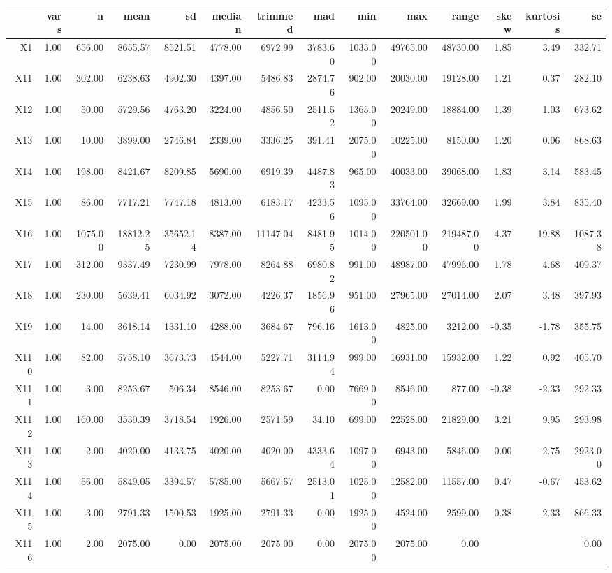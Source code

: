 % 
\begin{tabular}{rrrrrrrrrrrrrr}
  \hline
 & vars & n & mean & sd & median & trimmed & mad & min & max & range & skew & kurtosis & se \\ 
  \hline
X1 & 1.00 & 656.00 & 8655.57 & 8521.51 & 4778.00 & 6972.99 & 3783.60 & 1035.00 & 49765.00 & 48730.00 & 1.85 & 3.49 & 332.71 \\ 
  X11 & 1.00 & 302.00 & 6238.63 & 4902.30 & 4397.00 & 5486.83 & 2874.76 & 902.00 & 20030.00 & 19128.00 & 1.21 & 0.37 & 282.10 \\ 
  X12 & 1.00 & 50.00 & 5729.56 & 4763.20 & 3224.00 & 4856.50 & 2511.52 & 1365.00 & 20249.00 & 18884.00 & 1.39 & 1.03 & 673.62 \\ 
  X13 & 1.00 & 10.00 & 3899.00 & 2746.84 & 2339.00 & 3336.25 & 391.41 & 2075.00 & 10225.00 & 8150.00 & 1.20 & 0.06 & 868.63 \\ 
  X14 & 1.00 & 198.00 & 8421.67 & 8209.85 & 5690.00 & 6919.39 & 4487.83 & 965.00 & 40033.00 & 39068.00 & 1.83 & 3.14 & 583.45 \\ 
  X15 & 1.00 & 86.00 & 7717.21 & 7747.18 & 4813.00 & 6183.17 & 4233.56 & 1095.00 & 33764.00 & 32669.00 & 1.99 & 3.84 & 835.40 \\ 
  X16 & 1.00 & 1075.00 & 18812.25 & 35652.14 & 8387.00 & 11147.04 & 8481.95 & 1014.00 & 220501.00 & 219487.00 & 4.37 & 19.88 & 1087.38 \\ 
  X17 & 1.00 & 312.00 & 9337.49 & 7230.99 & 7978.00 & 8264.88 & 6980.82 & 991.00 & 48987.00 & 47996.00 & 1.78 & 4.68 & 409.37 \\ 
  X18 & 1.00 & 230.00 & 5639.41 & 6034.92 & 3072.00 & 4226.37 & 1856.96 & 951.00 & 27965.00 & 27014.00 & 2.07 & 3.48 & 397.93 \\ 
  X19 & 1.00 & 14.00 & 3618.14 & 1331.10 & 4288.00 & 3684.67 & 796.16 & 1613.00 & 4825.00 & 3212.00 & -0.35 & -1.78 & 355.75 \\ 
  X110 & 1.00 & 82.00 & 5758.10 & 3673.73 & 4544.00 & 5227.71 & 3114.94 & 999.00 & 16931.00 & 15932.00 & 1.22 & 0.92 & 405.70 \\ 
  X111 & 1.00 & 3.00 & 8253.67 & 506.34 & 8546.00 & 8253.67 & 0.00 & 7669.00 & 8546.00 & 877.00 & -0.38 & -2.33 & 292.33 \\ 
  X112 & 1.00 & 160.00 & 3530.39 & 3718.54 & 1926.00 & 2571.59 & 34.10 & 699.00 & 22528.00 & 21829.00 & 3.21 & 9.95 & 293.98 \\ 
  X113 & 1.00 & 2.00 & 4020.00 & 4133.75 & 4020.00 & 4020.00 & 4333.64 & 1097.00 & 6943.00 & 5846.00 & 0.00 & -2.75 & 2923.00 \\ 
  X114 & 1.00 & 56.00 & 5849.05 & 3394.57 & 5785.00 & 5667.57 & 2513.01 & 1025.00 & 12582.00 & 11557.00 & 0.47 & -0.67 & 453.62 \\ 
  X115 & 1.00 & 3.00 & 2791.33 & 1500.53 & 1925.00 & 2791.33 & 0.00 & 1925.00 & 4524.00 & 2599.00 & 0.38 & -2.33 & 866.33 \\ 
  X116 & 1.00 & 2.00 & 2075.00 & 0.00 & 2075.00 & 2075.00 & 0.00 & 2075.00 & 2075.00 & 0.00 &  &  & 0.00 \\ 
   \hline
\end{tabular}

